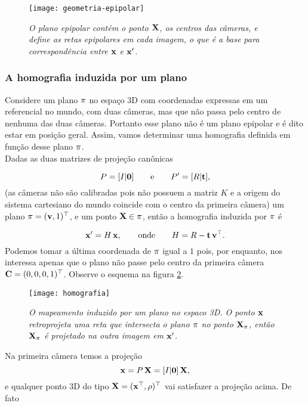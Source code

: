 \begin{figure}[!htb]
\centering
\texttt{[image: geometria-epipolar]}
\caption{\textit{O plano epipolar contém o ponto $\mathbf{X}$, os centros das câmeras, e define as retas epipolares em cada imagem, o que é a base para correspondência entre $\mathbf{x}$ e $\mathbf{x}'$.}}
\label{fig.geo-epipolar}
\end{figure}

\subsubsection{A homografia induzida por um plano}\label{sec.homografia}

Considere um plano $\pi$ no espaço 3D com coordenadas expressas em um referencial no mundo, com duas câmeras, mas que não passa pelo centro de nenhuma das duas câmeras. Portanto esse plano não é um plano epipolar e é dito estar em posição geral. Assim, vamos determinar uma homografia definida em função desse plano $\pi$.\\

Dadas as duas matrizes de projeção canônicas

\begin{equation*}
P=[I|{\bf 0}]\qquad\text{e}\qquad P'=[R|{\bf t}],
\end{equation*}
(as câmeras não são calibradas pois não possuem a matriz $K$ e a origem do sistema cartesiano do mundo coincide com o centro da primeira câmera) um plano $\pi=({\bf v},1)^\top$, e um ponto $\mathbf{X}\in\pi$, então a homografia induzida por $\pi$ é

\begin{equation*}
\mathbf{x}'=H\,\mathbf{x},\qquad\text{onde}\qquad H=R-{\bf t}\,{\bf v}^\top.
\end{equation*}
Podemos tomar a última coordenada de $\pi$ igual a $1$ pois, por enquanto, nos interessa apenas que o plano não passe pelo centro da primeira câmera ${\bf C}=(0,0,0,1)^\top$. Observe o esquema na figura \ref{fig.homografia}. 

\begin{figure}[!htb]
\centering
\texttt{[image: homografia]}
\caption{\textit{O mapeamento induzido por um plano no espaco 3D. O ponto $\mathbf{x}$ retroprojeta uma reta que intersecta o plano $\pi$ no ponto $\mathbf{X}_{\pi}$, então $\mathbf{X}_{\pi}$ é projetado na outra imagem em $\mathbf{x}'$.}}
\label{fig.homografia}
\end{figure}
Na primeira câmera temos a projeção
\begin{equation*}
\mathbf{x}=P\,\mathbf{X}=[I|{\bf 0}]\,\mathbf{X},
\end{equation*}
e qualquer ponto 3D do tipo $\mathbf{X}=(\mathbf{x}^\top,\rho)^\top$ vai satisfazer a projeção acima. De fato

